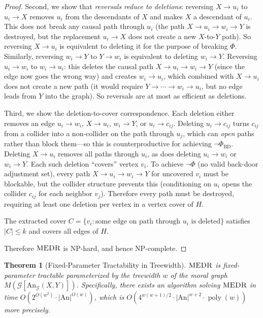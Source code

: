 \documentclass[11pt,a4paper]{article}
\newtheorem{theorem}{Theorem}[section]
\theoremstyle{definition}
\theoremstyle{remark}
\newcommand{\DAG}{\mathcal{G}}
\newcommand{\An}{\mathrm{An}}
\newcommand{\MEDR}{\textsc{MEDR}}
\newcommand{\Phi}{\varPhi}
\DeclareMathOperator{\poly}{poly}
\begin{document}
\begin{proof}
Second, we show that \emph{reversals reduce to deletions}: reversing $X \to u_i$ to
$u_i \to X$ removes $u_i$ from the descendants of $X$ and makes $X$ a descendant of
$u_i$. This does not break any causal path through $u_i$ (the path $X \to u_i \to w_i
\to Y$ is destroyed, but the replacement $u_i \to X$ does not create a new $X$-to-$Y$
path). So reversing $X \to u_i$ is equivalent to deleting it for the purpose of
breaking $\Phi$. Similarly, reversing $w_i \to Y$ to $Y \to w_i$ is equivalent to
deleting $w_i \to Y$. Reversing $u_i \to w_i$ to $w_i \to u_i$: this deletes the
causal path $X \to u_i \to w_i \to Y$ (since the edge now goes the wrong way) and
creates $w_i \to u_i$, which combined with $X \to u_i$ does not create a new path
(it would require $Y \to \cdots \to w_i \to u_i$, but no edge leads from $Y$ into
the graph). So reversals are at most as efficient as deletions.

Third, we show the deletion-to-cover correspondence. Each deletion either removes an
edge $u_i \to w_i$, $X \to u_i$, $w_i \to Y$, or $u_i \to c_{ij}$. Deleting
$u_i \to c_{ij}$ turns $c_{ij}$ from a collider into a non-collider on the path
through $u_j$, which can \emph{open} paths rather than block them---so this is
counterproductive for achieving $\neg\Phi_{\mathrm{BD}}$. Deleting $X \to u_i$
removes all paths through $u_i$, as does deleting $u_i \to w_i$ or $w_i \to Y$.
Each such deletion ``covers'' vertex $v_i$. To achieve $\neg\Phi$ (no valid
back-door adjustment set), every path $X \to u_i \to w_i \to Y$ for uncovered
$v_i$ must be blockable, but the collider structure prevents this (conditioning on
$u_i$ opens the collider $c_{ij}$ for each neighbor $v_j$). Therefore every path
must be destroyed, requiring at least one deletion per vertex in a vertex cover of $H$.

The extracted cover $C = \{v_i : \text{some edge on path through } u_i \text{ is deleted}\}$
satisfies $|C| \leq k$ and covers all edges of $H$.

Therefore $\MEDR$ is NP-hard, and hence NP-complete.
\end{proof}

\begin{theorem}[Fixed-Parameter Tractability in Treewidth]\label{thm:fpt}
$\MEDR$ is fixed-parameter tractable parameterized by the treewidth $w$ of the moral
graph $M(\DAG[\An_\DAG(X,Y)])$. Specifically, there exists an algorithm solving $\MEDR$
in time $O(2^{O(w^2)} \cdot |\An|^{O(w)})$, which is
$O(4^{w(w+1)/2} \cdot |\An|^{w+2} \cdot \poly(w))$ more precisely.
\end{theorem}
\end{document}
